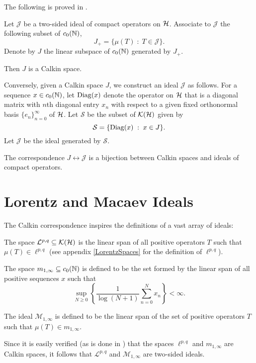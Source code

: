 The following is proved in \cite{SingularTraces}.
\begin{proposition}
    Let $\mathcal{J}$ be a two-sided ideal of compact operators on $\mathcal{H}$. Associate
    to $\mathcal{J}$ the following subset of $c_0(\mathbb{N})$,
    \begin{equation}
        J_+ = \{\mu(T)\;:\;T \in \mathcal{J}\}.
    \end{equation}
    Denote by $J$ the linear subspace of $c_0(\mathbb{N})$
    generated by $J_+$.
    
    Then $J$ is a Calkin space.
    
    
    Conversely, given a Calkin space $J$, we construct an
    ideal $\mathcal{J}$ as follows.
    For a sequence $x \in c_0(\mathbb{N})$, let $\operatorname{Diag}(x)$ denote
    the operator on $\mathcal{H}$ that is a diagonal matrix
    with $n$th diagonal entry $x_n$ with respect
    to a given fixed orthonormal basis $\{e_n\}_{n=0}^\infty$
    of $\mathcal{H}$. Let $\mathcal{S}$ be the subset of $\mathcal{K}(\mathcal{H})$
    given by
    \begin{equation}
        \mathcal{S} = \{\operatorname{Diag}(x)\;:\;x \in J\}.
    \end{equation}
    Let $\mathcal{J}$ be the ideal generated by $\mathcal{S}$.
    
    The correspondence $J \leftrightarrow \mathcal{J}$ is a bijection
    between Calkin spaces and ideals of compact operators.
\end{proposition}
    
\section{Lorentz and Macaev Ideals}
The Calkin correspondence inspires the definitions of a vast array of ideals:
\begin{definition}
    The space $\mathcal{L}^{p,q} \subseteq \mathcal{K}(\mathcal{H})$
    is the linear span of all positive operators $T$ such that $\mu(T) \in \ell^{p,q}$ (see
    appendix \ref{LorentzSpaces} for the definition of $\ell^{p,q}$).
\end{definition}
\begin{definition}
    The space $m_{1,\infty} \subseteq c_0(\mathbb{N})$ is defined to be the set
    formed by the linear span of all positive sequences $x$ such that
    \begin{equation}
        \sup_{N \geq 0} \left\{\frac{1}{\log(N+1)}\sum_{n=0}^N x_n \right\}< \infty.
    \end{equation}
    
    The ideal $\mathcal{M}_{1,\infty}$ is defined
    to be the linear span of the set of positive operators $T$
    such that $\mu(T) \in m_{1,\infty}$.
\end{definition}
Since it is easily verified (as is done in \cite{SingularTraces})
that the spaces $\ell^{p,q}$ and $m_{1,\infty}$ are Calkin spaces, it follows
that $\mathcal{L}^{p,q}$ and $\mathcal{M}_{1,\infty}$ are two-sided ideals.

